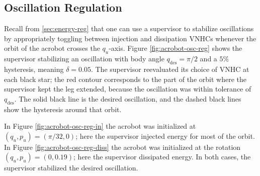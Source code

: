 \documentclass[journal,twoside,web]{ieeecolor}
\begin{document}
{\subsection{Oscillation Regulation}

Recall from \ref{sec:energy-reg} that one can use a supervisor to stabilize
oscillations by appropriately toggling between injection and dissipation VNHCs
whenever the orbit of the acrobot crosses the \(q_u\)-axis.
Figure \ref{fig:acrobot-osc-reg} shows the supervisor stabilizing an
oscillation with body angle \(q_\text{des} = \pi/2\) and a 
\(5\%\) hysteresis, meaning \(\delta = 0.05\).
The supervisor reevaluated its choice of VNHC at each black star;  
the red contour corresponds to the part of the orbit where the supervisor kept
the leg extended, because the oscillation was within tolerance of
\(q_\text{des}\).
The solid black line is the desired oscillation, and the dashed black
lines show the hysteresis around that orbit.

In Figure \ref{fig:acrobot-osc-reg-in} the acrobot was initialized at 
\((q_u,p_u) = (\pi/32,0)\); here the supervisor injected energy for most of the
orbit.
In Figure \ref{fig:acrobot-osc-reg-diss} the acrobot was initialized at the rotation
\((q_u,p_u) = (0,0.19)\); here the supervisor dissipated energy. 
In both cases, the supervisor stabilized the desired oscillation.

}
\end{document}
